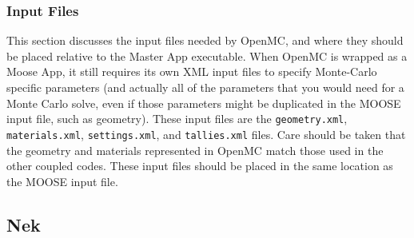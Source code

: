 \documentclass[10pt]{article}
\numberwithin{equation}{section} %
\begin{document}
\subsubsection{Input Files}
This section discusses the input files needed by OpenMC, and where they should be placed relative to the Master App executable. When OpenMC is wrapped as a Moose App, it still requires its own XML input files to specify Monte-Carlo specific parameters (and actually all of the parameters that you would need for a Monte Carlo solve, even if those parameters might be duplicated in the MOOSE input file, such as geometry). These input files are the {\tt geometry.xml}, {\tt materials.xml}, {\tt settings.xml}, and {\tt tallies.xml} files. Care should be taken that the geometry and materials represented in OpenMC match those used in the other coupled codes. These input files should be placed in the same location as the MOOSE input file.

\subsection{Nek}

\end{document}
